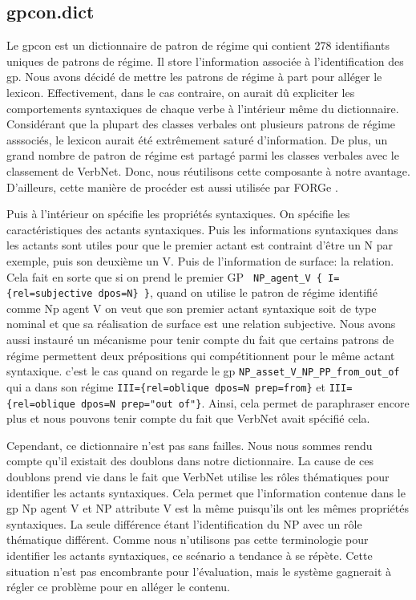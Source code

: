 \subsection{gpcon.dict}
Le gpcon est un dictionnaire de patron de régime qui contient 278 identifiants uniques de patrons de régime. Il store l'information associée à l'identification des gp. Nous avons décidé de mettre les patrons de régime à part pour alléger le lexicon. Effectivement, dans le cas contraire, on aurait dû expliciter les comportements syntaxiques de chaque verbe à l'intérieur même du dictionnaire. Considérant que la plupart des classes verbales ont plusieurs patrons de régime asssociés, le lexicon aurait été extrêmement saturé d'information. De plus, un grand nombre de patron de régime est partagé parmi les classes verbales avec le classement de VerbNet. Donc, nous réutilisons cette composante à notre avantage. D'ailleurs, cette manière de procéder est aussi utilisée par FORGe \citep{DBLP:conf/semeval/MilleCBW17, MilledemoFORGePompeu2017}.

Puis à l'intérieur on spécifie les propriétés syntaxiques. On spécifie les caractéristiques des actants syntaxiques. Puis les informations syntaxiques dans les actants sont utiles pour que le premier actant est contraint d'être un N par exemple, puis son deuxième un V. Puis de l'information de surface: la relation. Cela fait en sorte que si on prend le premier GP \lstinline! NP_agent_V { I={rel=subjective dpos=N} }!, quand on utilise le patron de régime identifié comme Np agent V on veut que son premier actant syntaxique soit de type nominal et que sa réalisation de surface est une relation subjective. Nous avons aussi instauré un mécanisme pour tenir compte du fait que certains patrons de régime permettent deux prépositions qui compétitionnent pour le même actant syntaxique. c'est le cas quand on regarde le gp \lstinline!NP_asset_V_NP_PP_from_out_of! qui a dans son régime \lstinline!III={rel=oblique dpos=N prep=from}! et \lstinline!III={rel=oblique dpos=N prep="out of"}!. Ainsi, cela permet de paraphraser encore plus et nous pouvons tenir compte du fait que VerbNet avait spécifié cela. 

Cependant, ce dictionnaire n'est pas sans failles. Nous nous sommes rendu compte qu'il existait des doublons dans notre dictionnaire. La cause de ces doublons prend vie dans le fait que VerbNet utilise les rôles thématiques pour identifier les actants syntaxiques. Cela permet que l'information contenue dans le gp Np agent V et NP attribute V est la même puisqu'ils ont les mêmes propriétés syntaxiques. La seule différence étant l'identification du NP avec un rôle thématique différent. Comme nous n'utilisons pas cette terminologie pour identifier les actants syntaxiques,  ce scénario a tendance à se répète. Cette situation n'est pas encombrante pour l'évaluation, mais le système gagnerait à régler ce problème pour en alléger le contenu.

